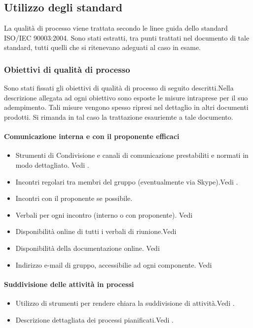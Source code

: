 \documentclass[12pt,a4paper]{article}
\begin{document}
\subsection{Utilizzo degli standard}
La qualità di processo viene trattata secondo le linee guida dello standard ISO/IEC 90003:2004. Sono stati estratti, tra punti trattati nel documento di tale standard, tutti quelli che si ritenevano adeguati al caso in esame.
\subsubsection{Obiettivi di qualità di processo}
Sono stati fissati gli obiettivi di qualità di processo di seguito descritti.Nella descrizione allegata ad ogni obiettivo sono esposte le misure intraprese per il suo adempimento. Tali misure vengono spesso ripresi nel dettaglio in altri documenti prodotti. Si rimanda in tal caso la trattazione esauriemte a tale documento. %

\paragraph{Comunicazione interna e con il proponente efficaci}
\begin{itemize}
	\item Strumenti di Condivisione e canali di comunicazione prestabiliti e normati in modo dettagliato. Vedi \NdP{}.
	\item Incontri regolari tra membri del gruppo (eventualmente via Skype).Vedi \NdP{}.
	\item Incontri con il proponente se possibile.
	\item Verbali per ogni incontro (interno o con proponente). Vedi \NdP{}
	\item Disponibilità online di tutti i verbali di riunione.Vedi \NdP{}
	\item Disponibilità della documentazione online. Vedi \NdP
	\item Indirizzo e-mail di gruppo, accessibilie ad ogni componente. Vedi \NdP{}
\end{itemize}

\paragraph{Suddivisione delle attività in processi}
\begin{itemize}
	\item Utilizzo di strumenti per rendere chiara la suddivisione di attività.Vedi \NdP{}.
	\item Descrizione dettagliata dei processi pianificati.Vedi \PdP{}.
\end{itemize}
\end{document}
